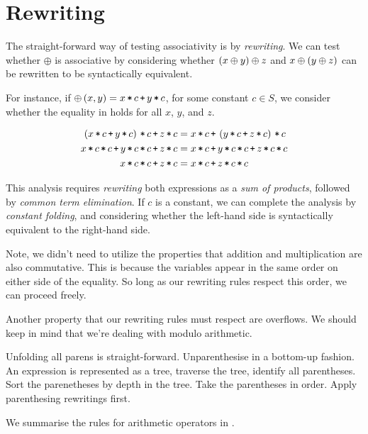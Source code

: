 
\section{Rewriting}

The straight-forward way of testing associativity is by \emph{rewriting}. We
can test whether $\oplus$ is associative by considering whether $\left({x \oplus y}\right)
\oplus z$ and $x \oplus \left({y \oplus z}\right)$ can be rewritten to be syntactically
equivalent.

For instance, if $\oplus\p{x,y} = x\lt c \lp y \lt c$, for some constant $c\in
S$, we consider whether the equality in  holds
for all $x$, $y$, and $z$.

\begin{figure*}[htbp!]
\begin{align*}
\p{x\lt c \lp y\lt c}\lt c \lp z\lt c &= x\lt c \lp \p{y\lt c \lp z\lt c}\lt c \\
x\lt c \lt c \lp y\lt c \lt c \lp z\lt c &= x\lt c \lp y\lt c \lt c \lp z\lt c \lt c \\
x\lt c \lt c \lp z\lt c &= x\lt c \lp z\lt c \lt c
\end{align*}
\caption[]{}
\label{figure:first-equality}
\end{figure*}

This analysis requires \emph{rewriting} both expressions as a \emph{sum of
products}, followed by \emph{common term elimination}. If $c$ is a constant, we
can complete the analysis by \emph{constant folding}, and considering whether
the left-hand side is syntactically equivalent to the right-hand side.

Note, we didn't need to utilize the properties that addition and multiplication
are also commutative.  This is because the variables appear in the same order
on either side of the equality. So long as our rewriting rules respect this
order, we can proceed freely. 

Another property that our rewriting rules must respect are overflows. We should
keep in mind that we're dealing with modulo arithmetic.

Unfolding all parens is straight-forward. Unparenthesise in a bottom-up
fashion. An expression is represented as a tree, traverse the tree, identify
all parentheses. Sort the parenetheses by depth in the tree. Take the
parentheses in order. Apply parenthesing rewritings first.

We summarise the rules for arithmetic operators in .


